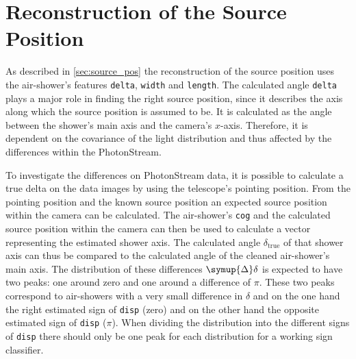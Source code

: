 \section{Reconstruction of the Source Position}
%
As described in \autoref{sec:source_pos} the reconstruction of the source
position uses the air-shower's features \texttt{delta}, \texttt{width} and
\texttt{length}. The calculated angle \texttt{delta} plays a major role in
finding the right source position, since it describes the axis along which
the source position is assumed to be. It is calculated as the angle between
the shower's main axis and the camera's $x$-axis. Therefore, it is dependent
on the covariance of the light distribution and thus affected by the
differences within the PhotonStream.

To investigate the differences on PhotonStream data, it is possible to
calculate a true delta on the data images by using the telescope's pointing
position. From the pointing position and the known source position an
expected source position within the camera can be calculated. The
air-shower's \texttt{cog} and the calculated source position within the camera can
then be used to calculate a vector representing the estimated shower axis.
The calculated angle $\delta_\text{true}$ of that shower axis can thus be
compared to the calculated angle of the cleaned air-shower's main axis. The
distribution of these differences $\symup{\Delta}\delta$ is expected to have two peaks: one around
zero and one around a difference of $\pi$. These two peaks correspond to
air-showers with a very small difference in $\delta$ and on the one hand the
right estimated sign of \texttt{disp} (zero) and on the other hand the
opposite estimated sign of \texttt{disp} ($\pi$). When dividing the
distribution into the different signs of \texttt{disp} there should only be
one peak for each distribution for a working sign classifier.


